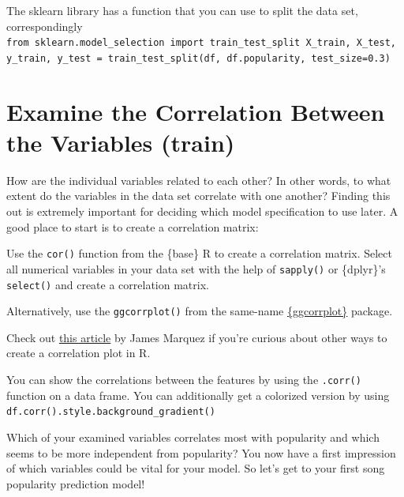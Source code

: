 \documentclass[
  11pt,
]{book}
\newenvironment{tips}[1]
  {
  \begin{itemize}
  \footnotesize
  \renewcommand{\labelitemi}{
    \raisebox{-.7\height}[0pt][0pt]{
      {\setkeys{Gin}{width=3em,keepaspectratio}
        \texttt{[image: images/\#1.png]}}
    }
  }
  \setlength{\fboxsep}{1em}
  \begin{rbox}
  \item
  }
  {
  \end{rbox}
  \end{itemize}
  }
\newenvironment{tipsp}[1]
  {
  \begin{itemize}
  \footnotesize
  \renewcommand{\labelitemi}{
    \raisebox{-.7\height}[0pt][0pt]{
      {\setkeys{Gin}{width=3em,keepaspectratio}
        \texttt{[image: images/\#1.png]}}
    }
  }
  \setlength{\fboxsep}{1em}
  \begin{pbox}
  \item
  }
  {
  \end{pbox}
  \end{itemize}
  }
\begin{document}
\begin{tipsp}p

The sklearn library has a function that you can use to split the data set, correspondingly
\texttt{from\ sklearn.model\_selection\ import\ train\_test\_split\ X\_train,\ X\_test,\ y\_train,\ y\_test\ =\ train\_test\_split(df,\ df.popularity,\ test\_size=0.3)}

\end{tipsp}

\hypertarget{examine-the-correlation-between-the-variables-train}{%
\section{Examine the Correlation Between the Variables (train)}\label{examine-the-correlation-between-the-variables-train}}

How are the individual variables related to each other? In other words, to what extent do the variables in the data set correlate with one another? Finding this out is extremely important for deciding which model specification to use later. A good place to start is to create a correlation matrix:

\begin{tips}r

Use the \texttt{cor()} function from the \{base\} R to create a correlation matrix. Select all numerical variables in your data set with the help of \texttt{sapply()} or \{dplyr\}'s \texttt{select()} and create a correlation matrix.

Alternatively, use the \texttt{ggcorrplot()} from the same-name \href{https://cran.r-project.org/package=ggcorrplot}{\{ggcorrplot\}} package.

Check out \href{http://jamesmarquezportfolio.com/correlation_matrices_in_r.html}{this article} by James Marquez if you're curious about other ways to create a correlation plot in R.

\end{tips}

\begin{tipsp}p

You can show the correlations between the features by using the \texttt{.corr()} function on a data frame. You can additionally get a colorized version by using \texttt{df.corr().style.background\_gradient()}

\end{tipsp}

Which of your examined variables correlates most with popularity and which seems to be more independent from popularity? You now have a first impression of which variables could be vital for your model. So let's get to your first song popularity prediction model!
\end{document}
